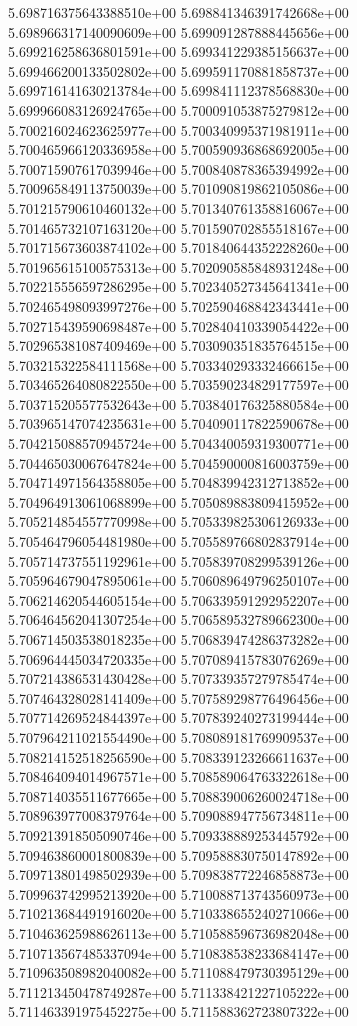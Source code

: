 5.698716375643388510e+00
5.698841346391742668e+00
5.698966317140090609e+00
5.699091287888445656e+00
5.699216258636801591e+00
5.699341229385156637e+00
5.699466200133502802e+00
5.699591170881858737e+00
5.699716141630213784e+00
5.699841112378568830e+00
5.699966083126924765e+00
5.700091053875279812e+00
5.700216024623625977e+00
5.700340995371981911e+00
5.700465966120336958e+00
5.700590936868692005e+00
5.700715907617039946e+00
5.700840878365394992e+00
5.700965849113750039e+00
5.701090819862105086e+00
5.701215790610460132e+00
5.701340761358816067e+00
5.701465732107163120e+00
5.701590702855518167e+00
5.701715673603874102e+00
5.701840644352228260e+00
5.701965615100575313e+00
5.702090585848931248e+00
5.702215556597286295e+00
5.702340527345641341e+00
5.702465498093997276e+00
5.702590468842343441e+00
5.702715439590698487e+00
5.702840410339054422e+00
5.702965381087409469e+00
5.703090351835764515e+00
5.703215322584111568e+00
5.703340293332466615e+00
5.703465264080822550e+00
5.703590234829177597e+00
5.703715205577532643e+00
5.703840176325880584e+00
5.703965147074235631e+00
5.704090117822590678e+00
5.704215088570945724e+00
5.704340059319300771e+00
5.704465030067647824e+00
5.704590000816003759e+00
5.704714971564358805e+00
5.704839942312713852e+00
5.704964913061068899e+00
5.705089883809415952e+00
5.705214854557770998e+00
5.705339825306126933e+00
5.705464796054481980e+00
5.705589766802837914e+00
5.705714737551192961e+00
5.705839708299539126e+00
5.705964679047895061e+00
5.706089649796250107e+00
5.706214620544605154e+00
5.706339591292952207e+00
5.706464562041307254e+00
5.706589532789662300e+00
5.706714503538018235e+00
5.706839474286373282e+00
5.706964445034720335e+00
5.707089415783076269e+00
5.707214386531430428e+00
5.707339357279785474e+00
5.707464328028141409e+00
5.707589298776496456e+00
5.707714269524844397e+00
5.707839240273199444e+00
5.707964211021554490e+00
5.708089181769909537e+00
5.708214152518256590e+00
5.708339123266611637e+00
5.708464094014967571e+00
5.708589064763322618e+00
5.708714035511677665e+00
5.708839006260024718e+00
5.708963977008379764e+00
5.709088947756734811e+00
5.709213918505090746e+00
5.709338889253445792e+00
5.709463860001800839e+00
5.709588830750147892e+00
5.709713801498502939e+00
5.709838772246858873e+00
5.709963742995213920e+00
5.710088713743560973e+00
5.710213684491916020e+00
5.710338655240271066e+00
5.710463625988626113e+00
5.710588596736982048e+00
5.710713567485337094e+00
5.710838538233684147e+00
5.710963508982040082e+00
5.711088479730395129e+00
5.711213450478749287e+00
5.711338421227105222e+00
5.711463391975452275e+00
5.711588362723807322e+00
